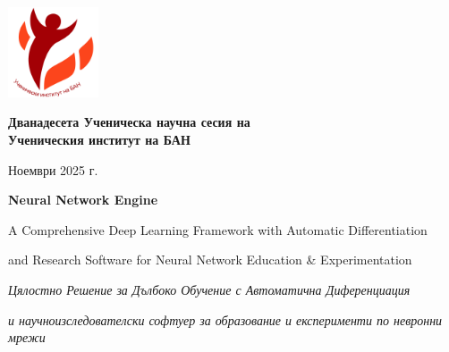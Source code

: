 \documentclass[11pt,a4paper]{report}
\begin{document}
\thispagestyle{empty}

\noindent
\begin{center}
\includegraphics[width=0.20\textwidth]{Uchi-BAN.jpg}
\end{center}

\vspace*{\fill}

\begin{center}

\begin{center}
{\Large\bfseries
Дванадесета Ученическа научна сесия на\\
Ученическия институт на БАН
}

\vspace{0.25em}

{\large\mdseries Ноември 2025 г.}
\end{center}



\vspace{1.5em}

{\Huge\textbf{Neural Network Engine}\par}

\vspace{0.4em}

{\Large A Comprehensive Deep Learning Framework with Automatic Differentiation\par}

\vspace{0.2em}

{\large and Research Software for Neural Network Education \& Experimentation\par}

{\large\itshape Цялостно Решение за Дълбоко Обучение с Автоматична Диференциация\par}
{\normalsize\itshape и научноизследователски софтуер за образование и експерименти по невронни мрежи\par}

\vspace{2.5em}


\end{center}
\end{document}
